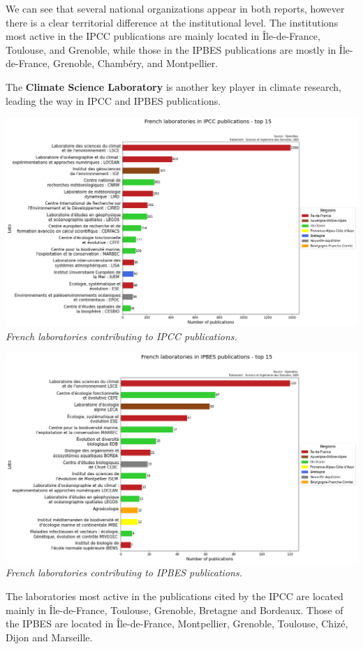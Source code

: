 \documentclass[
]{article}
\begin{document}
We can see that several national organizations appear in both reports,
however there is a clear territorial difference at the institutional
level. The institutions most active in the IPCC publications are mainly
located in Île-de-France, Toulouse, and Grenoble, while those in the
IPBES publications are mostly in Île-de-France, Grenoble, Chambéry, and
Montpellier.

The \textbf{Climate Science Laboratory} is another key player in climate
research, leading the way in IPCC and IPBES publications.

\includegraphics{./images/teds_ipcc_lab.png} \emph{French laboratories
contributing to IPCC publications.}

\includegraphics{./images/teds_ipbes_labs.png} \emph{French laboratories
contributing to IPBES publications.}

The laboratories most active in the publications cited by the IPCC are
located mainly in Île-de-France, Toulouse, Grenoble, Bretagne and
Bordeaux. Those of the IPBES are located in Île-de-France, Montpellier,
Grenoble, Toulouse, Chizé, Dijon and Marseille.
\end{document}
